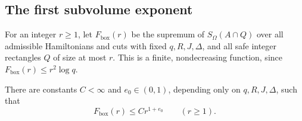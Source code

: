 \subsection{The first subvolume exponent}

For an integer $r\ge1$, let $F_{\mathrm{box}}(r)$ be the supremum of
$S_\Omega(A\cap Q)$ over all admissible Hamiltonians and cuts with
fixed $q,R,J,\Delta$, and all safe integer rectangles $Q$ of size at
most $r$.  This is a finite, nondecreasing function, since
$F_{\mathrm{box}}(r)\le r^2\log q$.

\begin{proposition}
\label{prop:initial-box}
There are constants $C<\infty$ and $e_0\in(0,1)$, depending only on
$q,R,J,\Delta$, such that
\begin{equation}
 F_{\mathrm{box}}(r)\le Cr^{1+e_0}\qquad(r\ge1).
 \label{eq:initial-box-bound}
\end{equation}
\end{proposition}

